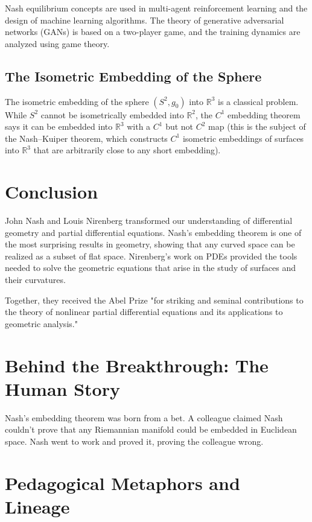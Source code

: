 Nash equilibrium concepts are used in multi-agent reinforcement learning and the design of machine learning algorithms. The theory of generative adversarial networks (GANs) is based on a two-player game, and the training dynamics are analyzed using game theory.

\subsection{The Isometric Embedding of the Sphere}

The isometric embedding of the sphere $(S^2, g_0)$ into $\mathbb{R}^3$ is a classical problem. While $S^2$ cannot be isometrically embedded into $\mathbb{R}^2$, the $C^1$ embedding theorem says it can be embedded into $\mathbb{R}^3$ with a $C^1$ but not $C^2$ map (this is the subject of the Nash--Kuiper theorem, which constructs $C^1$ isometric embeddings of surfaces into $\mathbb{R}^3$ that are arbitrarily close to any short embedding).

\section{Conclusion}

John Nash and Louis Nirenberg transformed our understanding of differential geometry and partial differential equations. Nash's embedding theorem is one of the most surprising results in geometry, showing that any curved space can be realized as a subset of flat space. Nirenberg's work on PDEs provided the tools needed to solve the geometric equations that arise in the study of surfaces and their curvatures.

Together, they received the Abel Prize "for striking and seminal contributions to the theory of nonlinear partial differential equations and its applications to geometric analysis."


\section{Behind the Breakthrough: The Human Story}
Nash's embedding theorem was born from a bet. A colleague claimed Nash couldn't prove that any Riemannian manifold could be embedded in Euclidean space. Nash went to work and proved it, proving the colleague wrong.

\section{Pedagogical Metaphors and Lineage}
